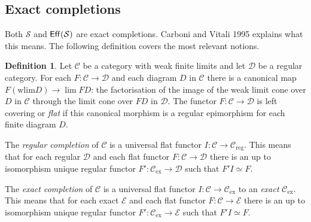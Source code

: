 \documentclass{amsart}
\theoremstyle{plain}
\theoremstyle{definition}
\newtheorem{defin}[theorem]{Definition}
\newcommand\hide[1]{}
\newcommand\cat\mathcal
\newcommand\N{\mathbf N}
\begin{document}
\hide{Het volgende probleem: een functie is volgens de interne taal berekenbaar, maar valt niet in de genoemde klasse van recursive functies. Kan dat niet voorkomen?
Het probleem is dan dat bewoonde deelverzamelingen van $\N$ niet altijd een globale snede hebben, wat meteen de reden is dat ik een projective terminaal wilde hebben.


Ik zie niet minder dan drie mogelijkheden:
1 alle bewoonde deelverzamelingen
2 alle deelverzamelingen met globale snede
3 alle deelverzamelingen die een numeral bevatten, i.e. waar ��n van de punten $s^n(0):1\to N$ doorheen gaat.

Ik vermoed dat ze allemaal verschillend kunnen zijn\dots

Geeft ook licht verschillende constructies van gepartitoneerde assemblies. Maar is er \'e\'en die we moeten ontwijken?
}

\subsection{Exact completions}
Both $\cat S$ and $\Eff(\cat S)$ are exact completions. Carboni and Vitali 1995%
explains what this means. The following definition covers the most relevant notions.

\newcommand\reg{_{\textrm{reg}}}
\newcommand\ex{_{\textrm{ex}}}
\newcommand\wlim{\mathrm{wlim}}
\begin{defin} Let $\cat C$ be a category with weak finite limits and let $\cat D$ be a regular category. For each $F:\cat C\to \cat D$ and each diagram $D$ in $\cat C$ there is a canonical map $F(\wlim D) \to \lim FD$: the factorisation of the image of the weak limit cone over $D$ in $\cat C$ through the limit cone over $FD$ in $\cat D$. The functor $F:\cat C \to \cat D$ is left covering or \emph{flat} if this canonical morphism is a regular epimorphism for each finite diagram $D$. 

The \emph{regular completion} of $\cat C$ is a universal flat functor $I:\cat C\to \cat C\reg$. This means that for each regular $\cat D$ and each flat functor $F:\cat C\to \cat D$ there is an up to isomorphism unique regular functor $F':\cat C\ex \to\cat D$ such that $F'I \simeq F$.

The \emph{exact completion} of $\cat C$ is a universal flat functor $I:\cat C\to \cat C\ex$ to an \emph{exact} $\cat C\ex$. This means that for each exact $\cat E$ and each flat functor $F:\cat C\to \cat E$ there is an up to isomorphism unique regular functor $F':\cat C\ex \to\cat E$ such that $F'I \simeq F$.
\end{defin}
\end{document}
